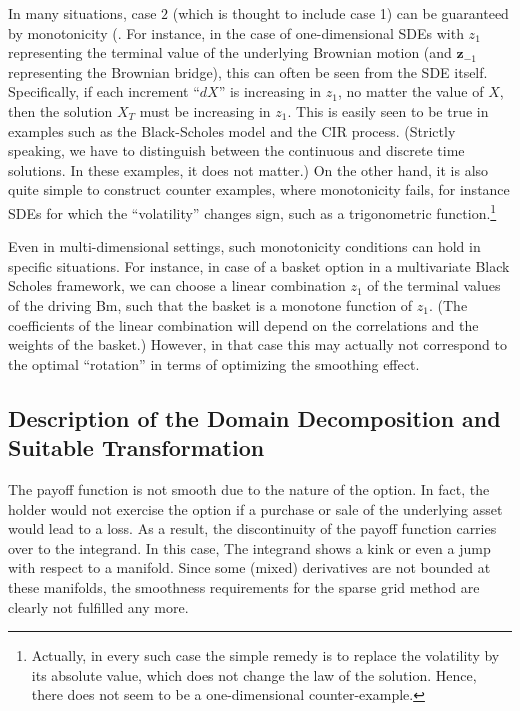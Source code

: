 \documentclass[11pt]{article}
\begin{document}
In many situations, case $2$ (which is thought to include case 1) can be
guaranteed by monotonicity (. For instance, in the case of one-dimensional SDEs
with $z_1$ representing the terminal value of the underlying Brownian motion (and $\mathbf{z}_{-1}$ representing the Brownian bridge), this can often be seen from the SDE itself. Specifically, if each increment ``$dX$'' is increasing in $z_1$, no matter the value of $X$, then the solution $X_T$ must be increasing
in $z_1$. This is easily seen to be true in examples such as the Black-Scholes model and the CIR process. (Strictly speaking, we have to distinguish between the continuous and discrete time solutions. In these examples, it does not matter.) On the other hand, it is also quite simple to construct counter examples, where monotonicity fails, for instance SDEs for which the ``volatility'' changes sign, such as a trigonometric function.\footnote{Actually, in every such case the simple remedy is to replace the volatility by its absolute value, which does not change the law of the solution. Hence, there does not seem to be a one-dimensional counter-example.}

Even in multi-dimensional settings, such monotonicity conditions can hold in specific situations. For instance, in case of a basket option in a multivariate Black Scholes framework, we can choose a linear combination $z_1$ of the terminal values of the driving Bm, such that the basket is a monotone function of $z_1$. (The coefficients of the linear combination will depend on the correlations and the weights of the basket.) However, in that case this may actually not correspond to the optimal ``rotation'' in terms of optimizing the smoothing effect.

\subsection{Description of the Domain Decomposition and Suitable Transformation}\label{sec:Description of the Domain Decomposition and Suitable Transformation}
The payoff function is not smooth due to
the nature of the option. In fact, the holder would not exercise
the option if a purchase or sale of the underlying asset would lead to a loss. As a result, the discontinuity of the payoff function carries over to the integrand. In this case, The integrand shows a kink  or even a jump with respect to a  manifold. Since some
(mixed) derivatives are not bounded at these manifolds, the smoothness requirements for the sparse grid method are clearly not fulfilled any more.
\end{document}

